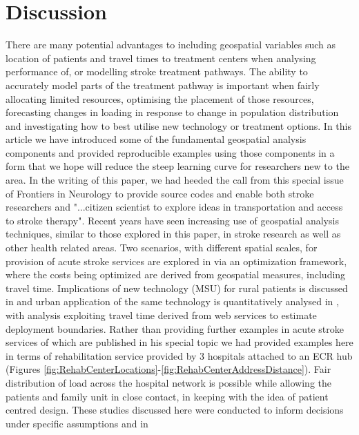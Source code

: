 \documentclass[utf8]{frontiersHLTH}
\begin{document}
\section{Discussion}\label{discussion} 
There are many potential advantages to including geospatial variables
such as location of patients and travel times to treatment centers
when analysing performance of, or modelling stroke treatment
pathways. The ability to accurately model parts of the treatment
pathway is important when fairly allocating limited resources,
optimising the placement of those resources, forecasting changes in
loading in response to change in population distribution and
investigating how to best utilise new technology or treatment
options. In this article we have introduced some of the fundamental
geospatial analysis components and provided reproducible examples
using those components in a form that we hope will reduce the steep
learning curve for researchers new to the area. In the writing of this
paper, we had heeded the call from this special issue of Frontiers in
Neurology to provide source codes and enable both stroke researchers
and "...citizen scientist to explore ideas in transportation and
access to stroke therapy". Recent years have seen increasing use of
geospatial analysis techniques, similar to those explored in this
paper, in stroke research as well as other health related areas. Two
scenarios, with different spatial scales, for provision of acute
stroke services are explored in \cite{10.3389/fneur.2019.00150} via an
optimization framework, where the costs being optimized are derived
from geospatial measures, including travel time. Implications of new
technology (MSU) for rural patients is discussed in
\cite{10.3389/fneur.2019.00159} and urban application of the same
technology is quantitatively analysed in
\cite{10.3389/fneur.2019.00331}, with analysis exploiting travel time
derived from web services to estimate deployment boundaries. Rather
than providing further examples in acute stroke services of which are
published in his special topic \cite{10.3389/fneur.2019.00150,
  10.3389/fneur.2019.00159, 10.3389/fneur.2019.00331} we had provided
examples here in terms of rehabilitation service provided by 3
hospitals attached to an ECR hub (Figures
\ref{fig:RehabCenterLocations}-\ref{fig:RehabCenterAddressDistance}). Fair
distribution of load across the hospital network is possible while
allowing the patients and family unit in close contact, in keeping
with the idea of patient centred design. These studies discussed here
were conducted to inform decisions under specific assumptions and in
\end{document}
